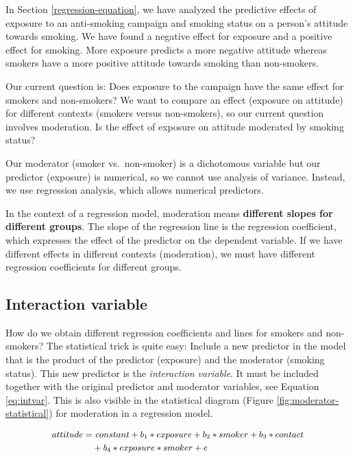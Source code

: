 \documentclass[a4paper]{book}
\theoremstyle{definition}
\theoremstyle{definition}
\theoremstyle{definition}
\theoremstyle{remark}
\begin{document}
In Section \ref{regression-equation}, we have analyzed the predictive
effects of exposure to an anti-smoking campaign and smoking status on a
person's attitude towards smoking. We have found a negative effect for
exposure and a positive effect for smoking. More exposure predicts a
more negative attitude whereas smokers have a more positive attitude
towards smoking than non-smokers.

Our current question is: Does exposure to the campaign have the same
effect for smokers and non-smokers? We want to compare an effect
(exposure on attitude) for different contexts (smokers versus
non-smokers), so our current question involves moderation. Is the effect
of exposure on attitude moderated by smoking status?

Our moderator (smoker vs.~non-smoker) is a dichotomous variable but our
predictor (exposure) is numerical, so we cannot use analysis of
variance. Instead, we use regression analysis, which allows numerical
predictors.

In the context of a regression model, moderation means \textbf{different
slopes for different groups}. The slope of the regression line is the
regression coefficient, which expresses the effect of the predictor on
the dependent variable. If we have different effects in different
contexts (moderation), we must have different regression coefficients
for different groups.

\subsection{Interaction variable}\label{interaction-variable}

How do we obtain different regression coefficients and lines for smokers
and non-smokers? The statistical trick is quite easy: Include a new
predictor in the model that is the product of the predictor (exposure)
and the moderator (smoking status). This new predictor is the
\emph{interaction variable}. It must be included together with the
original predictor and moderator variables, see Equation
\eqref{eq:intvar}. This is also visible in the statistical diagram (Figure
\ref{fig:moderator-statistical}) for moderation in a regression model.

\begin{equation}
\small
\begin{split}
  attitude = &\ constant + b_1*exposure + b_2*smoker + b_3*contact\\
  &+ b_4*exposure*smoker + e 
\end{split}
\label{eq:intvar} 
\normalsize
\end{equation}
\end{document}
